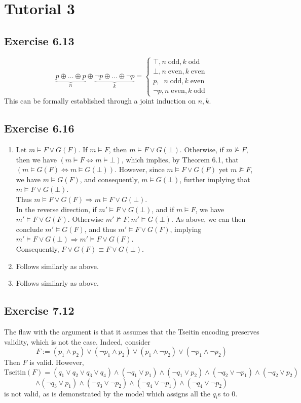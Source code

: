 \documentclass{article}
\begin{document}
\section{Tutorial 3}
\subsection*{Exercise 6.13}
$$\underbrace{p\oplus\ldots\oplus p}_{n}\oplus\underbrace{\lnot p\oplus\ldots\oplus\lnot p}_{k} = \begin{cases}
\top, n\;\mathrm{odd}, k\;\mathrm{odd}\\
\bot, n\;\mathrm{even}, k\;\mathrm{even}\\
p, \;\;n\;\mathrm{odd}, k\;\mathrm{even}\\
\lnot p, n\;\mathrm{even}, k\;\mathrm{odd}
\end{cases}$$
This can be formally established through a joint induction on $n, k$.
\subsection*{Exercise 6.16}
\begin{enumerate}[label=(\alph*)]
    \item Let $m\models F\lor G(F)$. If $m\models F$, then $m\models F\lor G(\bot)$. Otherwise, if $m\not\models F$, then we have $(m\models F\Leftrightarrow m\models\bot)$, which implies, by Theorem 6.1, that $(m\models G(F)\Leftrightarrow m\models G(\bot))$. However, since $m\models F\lor G(F)$ yet $m\not\models F$, we have $m\models G(F)$, and consequently, $m\models G(\bot)$, further implying that $m\models F\lor G(\bot)$.\\
    Thus $m\models F\lor G(F)\Rightarrow m\models F\lor G(\bot)$.\\
    In the reverse direction, if $m'\models F\lor G(\bot)$, and if $m\models F$, we have $m'\models F\lor G(F)$. Otherwise $m'\not\models F, m'\models G(\bot)$. As above, we can then conclude $m'\models G(F)$, and thus $m'\models F\lor G(F)$, implying $m'\models F\lor G(\bot)\Rightarrow m'\models F\lor G(F)$.\\
    Consequently, $F\lor G(F)\equiv F\lor G(\bot)$.
    \item Follows similarly as above.
    \item Follows similarly as above.
\end{enumerate}
\subsection*{Exercise 7.12}
The flaw with the argument is that it assumes that the Tseitin encoding preserves validity, which is not the case. Indeed, consider 
$$F := (p_1\wedge p_2)\lor(\lnot p_1\wedge p_2)\lor(p_1\wedge \lnot p_2)\lor(\lnot p_1\wedge \lnot p_2)$$
Then $F$ is valid. However, 
$$\mathrm{Tseitin}(F) = (q_1\lor q_2\lor q_3\lor q_4)\wedge (\lnot q_1\lor p_1)\wedge (\lnot q_1\lor p_2)\wedge (\lnot q_2\lor \lnot p_1)\wedge (\lnot q_2\lor p_2)$$
$$\wedge (\lnot q_3\lor p_1)\wedge (\lnot q_3\lor \lnot p_2)\wedge (\lnot q_4\lor \lnot p_1)\wedge (\lnot q_4\lor \lnot p_2)$$
is not valid, as is demonstrated by the model which assigns all the $q_i$s to $0$.\\
\end{document}
